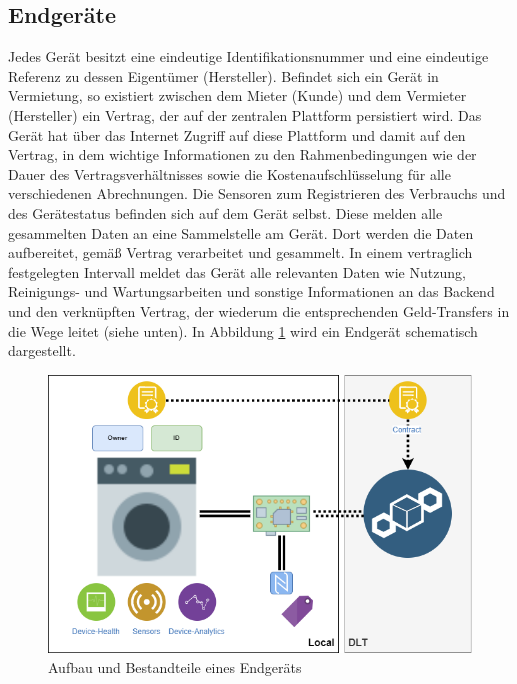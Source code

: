 \subsection{Endgeräte}
\label{subsec:iot_usecase:solution:device}
Jedes Gerät besitzt eine eindeutige Identifikationsnummer und eine eindeutige Referenz zu dessen Eigentümer (Hersteller). Befindet sich ein Gerät in Vermietung, so existiert zwischen dem Mieter (Kunde) und dem Vermieter (Hersteller) ein Vertrag, der auf der zentralen Plattform persistiert wird. Das Gerät hat über das Internet Zugriff auf diese Plattform und damit auf den Vertrag, in dem wichtige Informationen zu den Rahmenbedingungen wie der Dauer des Vertragsverhältnisses sowie die Kostenaufschlüsselung für alle verschiedenen Abrechnungen. Die Sensoren zum Registrieren des Verbrauchs und des Gerätestatus befinden sich auf dem Gerät selbst. Diese melden alle gesammelten Daten an eine Sammelstelle am Gerät. Dort werden die Daten aufbereitet, gemäß Vertrag verarbeitet und gesammelt. In einem vertraglich festgelegten Intervall meldet das Gerät alle relevanten Daten wie Nutzung, Reinigungs- und Wartungsarbeiten und sonstige Informationen an das Backend und den verknüpften Vertrag, der wiederum die entsprechenden Geld-Transfers in die Wege leitet (siehe unten). In Abbildung \ref{fig:chapter04:usecase_device} wird ein Endgerät schematisch dargestellt.

\begin{figure}[htbp]
 \centering
 \includegraphics[width=1.0\textwidth]{gfx/IOT-Anwendungsfall_Device.png}
 \caption{Aufbau und Bestandteile eines Endgeräts}
 \label{fig:chapter04:usecase_device}
\end{figure}

